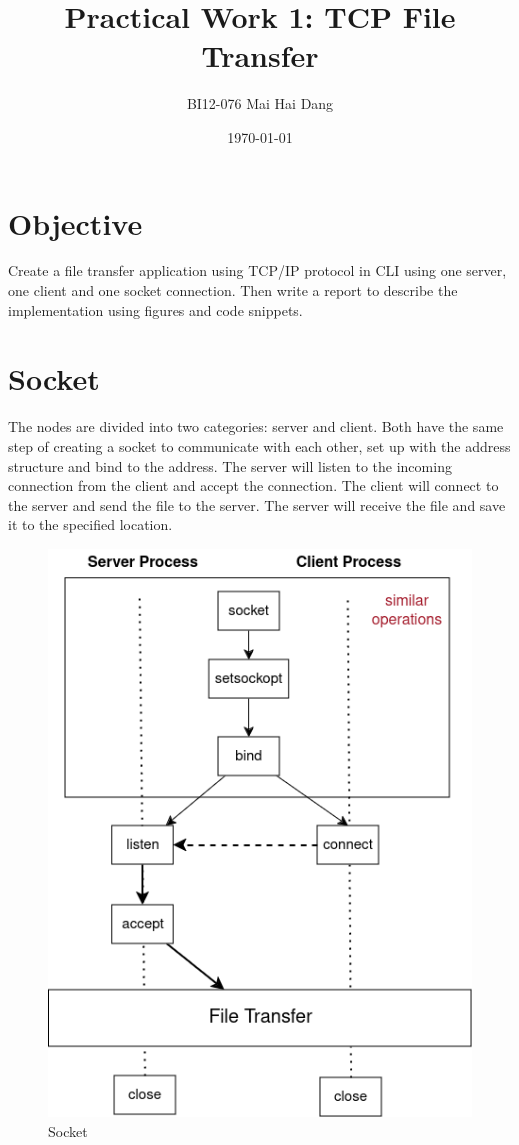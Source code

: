 \documentclass[11pt]{article}
\title{Practical Work 1: TCP File Transfer}
\author{ BI12-076 Mai Hai Dang }
\date{\today}
\begin{document}
\maketitle

\section{Objective}
Create a file transfer application using TCP/IP protocol in CLI using one server, one
client and one socket connection. Then write a report to describe the implementation
using figures and code snippets.

\section{Socket}

The nodes are divided into two categories: server and client. Both have the same
step of creating a socket to communicate with each other, set up with the address
structure and bind to the address. The server will listen to the incoming connection
from the client and accept the connection. The client will connect to the server and
send the file to the server. The server will receive the file and save it to the
specified location.

\begin{figure}[H]
  \includegraphics[scale=0.4]{socket.png}
  \centering
  \caption{Socket}
\end{figure}
\end{document}

